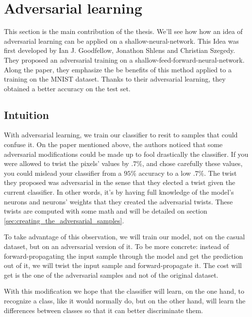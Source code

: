 


\chapter{Adversarial learning}
\label{sec:adversarial_learning}

	This section is the main contribution of the thesis. We'll see how how an idea of adversarial learning can be applied on a shallow-neural-network. This Idea was first developed by Ian J. Goodfellow, Jonathon Shlens and Christian Szegedy. They proposed an adversarial training on a shallow-feed-forward-neural-network. Along the paper\cite{goodfellow2014explaining}, they emphasize the be benefits of this method applied to a training on the MNIST dataset\cite{lecun-mnist}. Thanks to their adversarial learning, they obtained a better accuracy on the test set.


	
	\section{Intuition}
	\label{sub:intuition}
		With adversarial learning, we train our classifier to resit to samples that could confuse it. On the paper mentioned above\cite{goodfellow2014explaining}, the authors noticed that some adversarial modifications could be made up to fool drastically the classifier. If you were allowed to twist the pixels' values by $.7\%$, and chose carefully these values, you could mislead your classifier from a $95\%$ accuracy to a low $.7\%$. The twist they proposed was adversarial in the sense that they elected a twist given the current classifier. In other words, it's by having full knowledge of the model's neurons and neurons' weights that they created the adversarial twists. These twists are computed with some math and will be detailed on section \ref{sec:creating_the_adversarial_samples}.

		To take advantage of this observation, we will train our model, not on the casual dataset, but on an adversarial version of it. To be more concrete: instead of forward-propagating the input sample through the model and get the prediction out of it, we will twist the input sample and forward-propagate it. The cost will get is the one of the adversarial samples and not of the original dataset.

		With this modification we hope that the classifier will learn, on the one hand, to recognize a class, like it would normally do, but on the other hand, will learn the differences between classes so that it can better discriminate them. 

